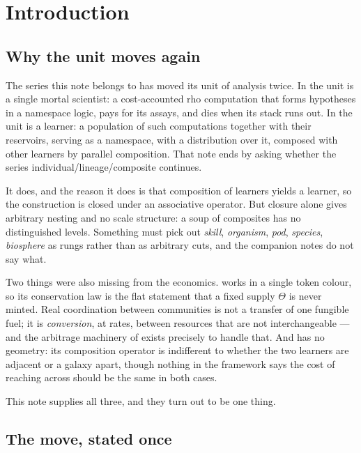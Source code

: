 \bigskip

\section{Introduction}\label{eng:S1}

\subsection{Why the unit moves again}\label{eng:S1.1}

The series this note belongs to has moved its unit of analysis twice. In
\chSci the unit is a single mortal scientist: a cost-accounted
rho computation that forms hypotheses in a namespace logic, pays for its
assays, and dies when its stack runs out. In \chComp the unit is a
learner: a population of such computations together with their reservoirs,
serving as a namespace, with a distribution over it, composed with other
learners by parallel composition. That note ends by asking whether the
series individual/lineage/composite continues.

It does, and the reason it does is that composition of learners yields a
learner, so the construction is closed under an associative operator. But
closure alone gives arbitrary nesting and no scale structure: a soup of
composites has no distinguished levels. Something must pick out
\emph{skill}, \emph{organism}, \emph{pod}, \emph{species}, \emph{biosphere}
as rungs rather than as arbitrary cuts, and the companion notes do not say
what.

Two things were also missing from the economics. \chComp works in a
single token colour, so its conservation law is the flat statement that a
fixed supply $\Theta$ is never minted. Real coordination between
communities is not a transfer of one fungible fuel; it is
\emph{conversion}, at rates, between resources that are not interchangeable
--- and the arbitrage machinery of \cite{vtok} exists precisely to handle
that. And \chComp has no geometry: its composition operator is
indifferent to whether the two learners are adjacent or a galaxy apart,
though nothing in the framework says the cost of reaching across should be
the same in both cases.

This note supplies all three, and they turn out to be one thing.

\subsection{The move, stated once}\label{eng:S1.2}

